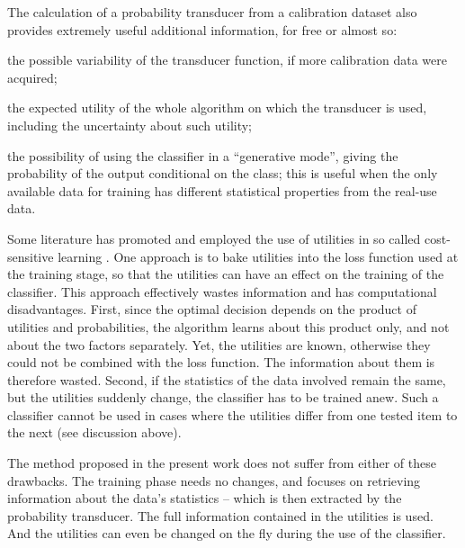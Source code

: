 \documentclass[\ifafour a4paper,12pt,\else a5paper,10pt,\fi%
onecolumn,oneside,article,%
british%
]{memoir}
\theoremstyle{remark}
\theoremstyle{innote}
\renewcommand*{\|}[1][]{\nonscript\:#1\vert\nonscript\:\mathopen{}}
\newcommand*{\sects}{\S\S}%
\begin{document}
The calculation of a probability transducer from a calibration dataset also provides extremely useful additional information, for free or almost so:
\begin{enumerate*}[label=(\alph*)]
\item the possible variability of the transducer function, if more calibration data were acquired; 
\item the expected utility of the whole algorithm on which the transducer is used, including the uncertainty about such utility;
\item the possibility of using the classifier in a \enquote{generative mode}, giving the probability of the output conditional on the class; this is useful when the only available data for training has different statistical properties from the real-use data.
\end{enumerate*}

\medskip

Some literature has promoted and employed the use of utilities in so called cost-sensitive learning \autocites{elkan2001,correabahnsenetal2015,lingetal2017}. One approach is to bake utilities into the loss function used at the training stage, so that the utilities can have an effect on the training of the classifier. This approach effectively wastes information and has computational disadvantages. First, since the optimal decision depends on the product of utilities and probabilities, the algorithm learns about this product only, and not about the two factors separately. \autocites[In][\sects~2--3, for example, the decision threshold of the algorithm is changed by making the algorithm  learn wrong class probabilities on purpose]{elkan2001} Yet, the utilities are known, otherwise they could not be combined with the loss function. The information about them is therefore wasted. Second, if the statistics of the data involved remain the same, but the utilities suddenly change, the classifier has to be trained anew. Such a classifier cannot be used in cases where the utilities differ from one tested item to the next (see discussion above).

The method proposed in the present work does not suffer from either of these drawbacks. The training phase needs no changes, and focuses on retrieving information about the data's statistics -- which is then extracted by the probability transducer. The full information contained in the utilities is used. And the utilities can even be changed on the fly during the use of the classifier.
\end{document}
